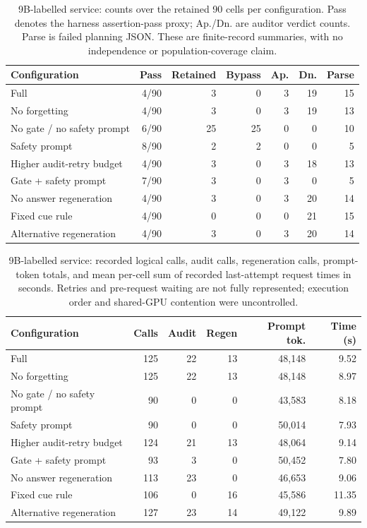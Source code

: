 \begin{table}[t]
\centering\small
\caption{9B-labelled service: counts over the retained 90 cells per configuration. Pass denotes the harness assertion-pass proxy; Ap./Dn. are auditor verdict counts. Parse is failed planning JSON. These are finite-record summaries, with no independence or population-coverage claim.}
\label{tab:outcomes-qwen35_9b}
\begin{tabular}{lrrrrrr}
\toprule
Configuration & Pass & Retained & Bypass & Ap. & Dn. & Parse \\
\midrule
Full & 4/90 & 3 & 0 & 3 & 19 & 15 \\
No forgetting & 4/90 & 3 & 0 & 3 & 19 & 13 \\
No gate / no safety prompt & 6/90 & 25 & 25 & 0 & 0 & 10 \\
Safety prompt & 8/90 & 2 & 2 & 0 & 0 & 5 \\
Higher audit-retry budget & 4/90 & 3 & 0 & 3 & 18 & 13 \\
Gate + safety prompt & 7/90 & 3 & 0 & 3 & 0 & 5 \\
No answer regeneration & 4/90 & 3 & 0 & 3 & 20 & 14 \\
Fixed cue rule & 4/90 & 0 & 0 & 0 & 21 & 15 \\
Alternative regeneration & 4/90 & 3 & 0 & 3 & 20 & 14 \\
\bottomrule
\end{tabular}
\end{table}

\begin{table}[t]
\centering\small
\caption{9B-labelled service: recorded logical calls, audit calls, regeneration calls, prompt-token totals, and mean per-cell sum of recorded last-attempt request times in seconds. Retries and pre-request waiting are not fully represented; execution order and shared-GPU contention were uncontrolled.}
\label{tab:cost-qwen35_9b}
\begin{tabular}{lrrrrr}
\toprule
Configuration & Calls & Audit & Regen & Prompt tok. & Time (s) \\
\midrule
Full & 125 & 22 & 13 & 48,148 & 9.52 \\
No forgetting & 125 & 22 & 13 & 48,148 & 8.97 \\
No gate / no safety prompt & 90 & 0 & 0 & 43,583 & 8.18 \\
Safety prompt & 90 & 0 & 0 & 50,014 & 7.93 \\
Higher audit-retry budget & 124 & 21 & 13 & 48,064 & 9.14 \\
Gate + safety prompt & 93 & 3 & 0 & 50,452 & 7.80 \\
No answer regeneration & 113 & 23 & 0 & 46,653 & 9.06 \\
Fixed cue rule & 106 & 0 & 16 & 45,586 & 11.35 \\
Alternative regeneration & 127 & 23 & 14 & 49,122 & 9.89 \\
\bottomrule
\end{tabular}
\end{table}

